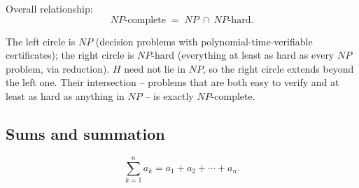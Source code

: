 \documentclass[11pt]{article}
\begin{document}
\smallskip
\noindent Overall relationship:
\[
NP\text{-complete} \;=\; NP \ \cap\ NP\text{-hard}.
\]

\begin{center}
\end{center}

\noindent The left circle is $NP$ (decision problems with polynomial-time-verifiable certificates); the right circle is $NP$-hard (everything at least as hard as every $NP$ problem, via reduction). $H$ need not lie in $NP$, so the right circle extends beyond the left one. Their intersection -- problems that are both easy to verify and at least as hard as anything in $NP$ -- is exactly $NP$-complete.

\subsection{Sums and summation}
\label{sec:6-10}

\begin{note}[Notation]
\[
\sum_{k=1}^n a_k = a_1+a_2+\cdots+a_n.
\]
\end{note}
\end{document}
